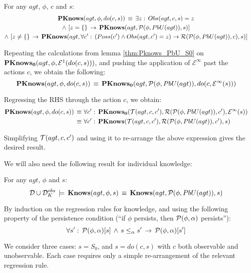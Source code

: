 \begin{thm}
\label{thm:Pknows_PbU_do}For any $agt$, $\phi$, $c$ and $s$:\begin{multline*}
\mathbf{PKnows}(agt,\phi,do(c,s))\,\equiv\,\exists z:\, Obs(agt,c,s)=z\\
\wedge\,\left[z=\{\}\,\rightarrow\,\mathbf{PKnows}(agt,\mathcal{P}(\phi,PbU(agt)),s)\right]\\
\wedge\,\left[z\neq\{\}\,\rightarrow\,\mathbf{PKnows}(agt,\forall c':\,\left(Poss(c')\wedge Obs(agt,c')=z\right)\rightarrow\mathcal{R}(\mathcal{P}(\phi,PbU(agt)),c),s)\right]\end{multline*}

\end{thm}
\begin{proofsketch}
Repeating the calculations from lemma \ref{thm:Pknows_PbU_S0} on
$\mathbf{PKnows_{0}}(agt,\phi,\mathcal{E}^{1}(do(c,s)))$, and pushing the application
of $\mathcal{E}^{\infty}$ past the actions $c$, we obtain the following:\[
\mathbf{PKnows}(agt,\phi,do(c,s))\,\equiv\,\mathbf{PKnows_{0}}(agt,\mathcal{P}(\phi,PbU(agt)),do(c,\mathcal{E}^{\infty}(s)))\]


Regressing the RHS through the action $c$, we obtain:\begin{align*}
\mathbf{PKnows}(agt,\phi,do(c,s))\,\equiv\,\, & \forall c':\,\mathbf{PKnows_{0}}(\mathcal{T}(agt,c,c'),\mathcal{R}(\mathcal{P}(\phi,PbU(agt)),c'),\mathcal{E}^{\infty}(s))\\
\equiv\,\, & \forall c':\,\mathbf{PKnows}(\mathcal{T}(agt,c,c'),\mathcal{R}(\mathcal{P}(\phi,PbU(agt)),c'),s)\end{align*}


Simplifying $\mathcal{T}(agt,c,c')$ and using it to re-arrange the above
expression gives the desired result. 
\end{proofsketch}
We will also need the following result for individual knowledge:

\begin{thm}
\label{thm:Knows_impl_KnowsPbU}For any $agt$, $\phi$ and $s$:\[
\mathcal{D}\cup\mathcal{D}_{K}^{obs}\,\models\,\mathbf{Knows}(agt,\phi,s)\,\equiv\,\mathbf{Knows}(agt,\mathcal{P}(\phi,PbU(agt)),s)\]

\end{thm}
\begin{proofsketch}
By induction on the regression rules for knowledge, and using the
following property of the persistence condition ({}``if $\phi$ persists,
then $\mathcal{P}(\phi,\alpha)$ persists''):\[
\forall s':\,\mathcal{P}(\phi,\alpha)[s]\,\wedge\, s\leq_{\alpha}s'\,\rightarrow\,\mathcal{P}(\phi,\alpha)[s']\]


We consider three cases: $s=S_{0}$, and $s=do(c,s)$ with $c$ both
observable and unobservable. Each case requires only a simple re-arrangement
of the relevant regression rule. 
\end{proofsketch}
\medskip{}


